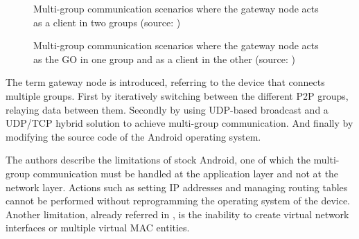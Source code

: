 \begin{figure}[ht]
	\noindent{}
	\caption{\label{fig:mhopd2dgm} Multi-group communication scenarios where the gateway node acts as a client in two groups (source: \cite{multiHopD2D})}
\end{figure}
\begin{figure}[ht]
	\noindent{}
	\caption{\label{fig:mhopd2dgo} Multi-group communication scenarios where the gateway node acts as the GO in one group and as a client in the other (source: \cite{multiHopD2D})}
\end{figure}

The term gateway node is introduced, referring to the device that connects multiple groups. First by iteratively switching between the different P2P groups, relaying data between them. Secondly by using \gls{UDP}-based broadcast and a \gls{UDP}/\gls{TCP} hybrid solution to achieve multi-group communication. And finally by modifying the source code of the Android operating system.

The authors describe the limitations of stock Android, one of which the multi-group communication must be handled at the application layer and not at the network layer. Actions such as setting \gls{IP} addresses and managing routing tables cannot be performed without reprogramming the operating system of the device. Another limitation, already referred in \cite{routeMultiGroup}, is the inability to create virtual network interfaces or multiple virtual MAC entities.

